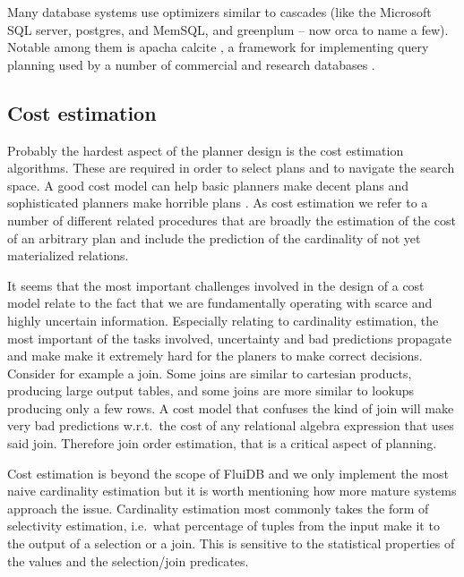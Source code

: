 Many database systems use optimizers similar to cascades (like the
Microsoft SQL server, postgres, and
MemSQL\cite{chenMemSQLQueryOptimizer2016}, and greenplum -- now orca
\cite{solimanOrcaModularQuery2014a} to name a few). Notable among them
is apacha calcite \cite{begoliApacheCalciteFoundational2018}, a
framework for implementing query planning used by a number of
commercial and research databases
\cite{nunesalonsoBuildingPolyglotData2020}.

\subsection{Cost estimation}
\label{sec:org4f8e111}

Probably the hardest aspect of the planner design is the cost
estimation algorithms. These are required in order to select plans and
to navigate the search space. A good cost model can help basic
planners make decent plans and sophisticated planners make horrible
plans \cite{leisHowGoodAre2015}. As cost estimation we refer to a
number of different related procedures that are broadly the estimation
of the cost of an arbitrary plan and include the prediction of the
cardinality of not yet materialized relations.

It seems that the most important challenges involved in the design of
a cost model relate to the fact that we are fundamentally operating
with scarce and highly uncertain information. Especially relating to
cardinality estimation, the most important of the tasks involved,
uncertainty and bad predictions propagate and make make it extremely
hard for the planers to make correct decisions. Consider for example a
join. Some joins are similar to cartesian products, producing large
output tables, and some joins are more similar to lookups producing
only a few rows. A cost model that confuses the kind of join will make
very bad predictions w.r.t.\ the cost of any relational algebra
expression that uses said join. Therefore join order estimation, that
is a critical aspect of planning.

Cost estimation is beyond the scope of FluiDB and we only implement
the most naive cardinality estimation but it is worth mentioning how
more mature systems approach the issue. Cardinality estimation most
commonly takes the form of selectivity estimation, i.e.\  what
percentage of tuples from the input make it to the output of a
selection or a join. This is sensitive to the statistical
properties of the values and the selection/join predicates.

